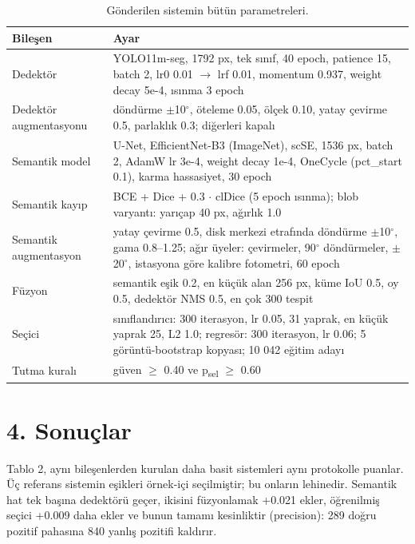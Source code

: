 \begin{table}[t]
\centering\footnotesize
\caption{Gönderilen sistemin bütün parametreleri.}
\begin{tabular}{@{}
  >{\raggedright\arraybackslash}p{}
  >{\raggedright\arraybackslash}p{}@{}}
\toprule
\begin{minipage}[b]{\linewidth}\raggedright
Bileşen
\end{minipage} & \begin{minipage}[b]{\linewidth}\raggedright
Ayar
\end{minipage} \\
\midrule
Dedektör & YOLO11m-seg, 1792 px, tek sınıf, 40 epoch, patience 15, batch 2, lr0 0.01 $\rightarrow$ lrf 0.01, momentum 0.937, weight decay 5e-4, ısınma 3 epoch \\
Dedektör augmentasyonu & döndürme $\pm$10$^\circ$, öteleme 0.05, ölçek 0.10, yatay çevirme 0.5, parlaklık 0.3; diğerleri kapalı \\
Semantik model & U-Net, EfficientNet-B3 (ImageNet), scSE, 1536 px, batch 2, AdamW lr 3e-4, weight decay 1e-4, OneCycle (pct\_start 0.1), karma hassasiyet, 30 epoch \\
Semantik kayıp & BCE + Dice + 0.3 $\cdot$ clDice (5 epoch ısınma); blob varyantı: yarıçap 40 px, ağırlık 1.0 \\
Semantik augmentasyon & yatay çevirme 0.5, disk merkezi etrafında döndürme $\pm$10$^\circ$, gama 0.8--1.25; ağır üyeler: çevirmeler, 90$^\circ$ döndürmeler, $\pm$20$^\circ$, istasyona göre kalibre fotometri, 60 epoch \\
Füzyon & semantik eşik 0.2, en küçük alan 256 px, küme IoU 0.5, oy 0.5, dedektör NMS 0.5, en çok 300 tespit \\
Seçici & sınıflandırıcı: 300 iterasyon, lr 0.05, 31 yaprak, en küçük yaprak 25, L2 1.0; regresör: 300 iterasyon, lr 0.06; 5 görüntü-bootstrap kopyası; 10 042 eğitim adayı \\
Tutma kuralı & güven $\geq$ 0.40 ve p\textsubscript{sel} $\geq$ 0.60 \\
\bottomrule
\end{tabular}
\end{table}

\section{4. Sonuçlar}\label{sonuuxe7lar}

Tablo 2, aynı bileşenlerden kurulan daha basit sistemleri aynı protokolle puanlar. Üç referans
sistemin eşikleri örnek-içi seçilmiştir; bu onların lehinedir. Semantik hat tek başına dedektörü
geçer, ikisini füzyonlamak +0.021 ekler, öğrenilmiş seçici +0.009 daha ekler ve bunun tamamı
kesinliktir (precision): 289 doğru pozitif pahasına 840 yanlış pozitifi kaldırır.

